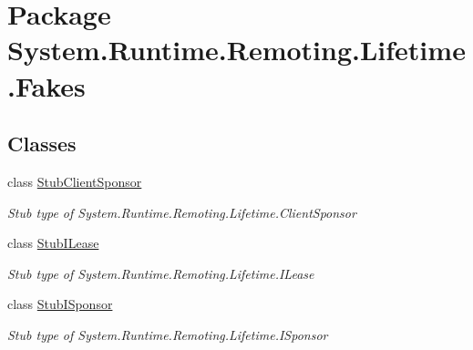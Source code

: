 \hypertarget{namespace_system_1_1_runtime_1_1_remoting_1_1_lifetime_1_1_fakes}{\section{Package System.\-Runtime.\-Remoting.\-Lifetime.\-Fakes}
\label{namespace_system_1_1_runtime_1_1_remoting_1_1_lifetime_1_1_fakes}
}
\subsection*{Classes}
\begin{DoxyCompactItemize}
\item 
class \hyperlink{class_system_1_1_runtime_1_1_remoting_1_1_lifetime_1_1_fakes_1_1_stub_client_sponsor}{Stub\-Client\-Sponsor}
\begin{DoxyCompactList}\small\item\em Stub type of System.\-Runtime.\-Remoting.\-Lifetime.\-Client\-Sponsor\end{DoxyCompactList}\item 
class \hyperlink{class_system_1_1_runtime_1_1_remoting_1_1_lifetime_1_1_fakes_1_1_stub_i_lease}{Stub\-I\-Lease}
\begin{DoxyCompactList}\small\item\em Stub type of System.\-Runtime.\-Remoting.\-Lifetime.\-I\-Lease\end{DoxyCompactList}\item 
class \hyperlink{class_system_1_1_runtime_1_1_remoting_1_1_lifetime_1_1_fakes_1_1_stub_i_sponsor}{Stub\-I\-Sponsor}
\begin{DoxyCompactList}\small\item\em Stub type of System.\-Runtime.\-Remoting.\-Lifetime.\-I\-Sponsor\end{DoxyCompactList}\end{DoxyCompactItemize}
